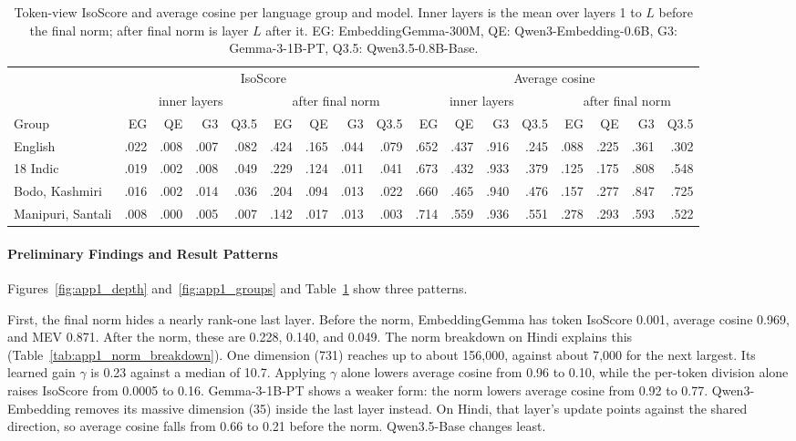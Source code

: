 \begin{table}[t]
\centering
\small
\setlength{\tabcolsep}{3.6pt}
\begin{tabular}{lrrrrrrrrrrrrrrrr}
\toprule
 & \multicolumn{8}{c}{IsoScore} & \multicolumn{8}{c}{Average cosine} \\
\cmidrule(lr){2-9}\cmidrule(lr){10-17}
 & \multicolumn{4}{c}{inner layers} & \multicolumn{4}{c}{after final norm} & \multicolumn{4}{c}{inner layers} & \multicolumn{4}{c}{after final norm} \\
\cmidrule(lr){2-5}\cmidrule(lr){6-9}\cmidrule(lr){10-13}\cmidrule(lr){14-17}
Group & EG & QE & G3 & Q3.5 & EG & QE & G3 & Q3.5 & EG & QE & G3 & Q3.5 & EG & QE & G3 & Q3.5 \\
\midrule
English & .022 & .008 & .007 & .082 & .424 & .165 & .044 & .079 & .652 & .437 & .916 & .245 & .088 & .225 & .361 & .302 \\
18 Indic & .019 & .002 & .008 & .049 & .229 & .124 & .011 & .041 & .673 & .432 & .933 & .379 & .125 & .175 & .808 & .548 \\
Bodo, Kashmiri & .016 & .002 & .014 & .036 & .204 & .094 & .013 & .022 & .660 & .465 & .940 & .476 & .157 & .277 & .847 & .725 \\
Manipuri, Santali & .008 & .000 & .005 & .007 & .142 & .017 & .013 & .003 & .714 & .559 & .936 & .551 & .278 & .293 & .593 & .522 \\
\bottomrule
\end{tabular}
\caption{Token-view IsoScore and average cosine per language group and model. Inner layers is the mean over layers 1 to $L$ before the final norm; after final norm is layer $L$ after it. EG: EmbeddingGemma-300M, QE: Qwen3-Embedding-0.6B, G3: Gemma-3-1B-PT, Q3.5: Qwen3.5-0.8B-Base.}
\label{tab:app1_groups}
\end{table}

\paragraph{Preliminary Findings and Result Patterns}
Figures~\ref{fig:app1_depth} and~\ref{fig:app1_groups} and Table~\ref{tab:app1_groups} show three patterns.

First, the final norm hides a nearly rank-one last layer. Before the norm, EmbeddingGemma has token IsoScore 0.001, average cosine 0.969, and MEV 0.871. After the norm, these are 0.228, 0.140, and 0.049. The norm breakdown on Hindi explains this (Table~\ref{tab:app1_norm_breakdown}). One dimension (731) reaches up to about 156{,}000, against about 7{,}000 for the next largest. Its learned gain $\gamma$ is 0.23 against a median of 10.7. Applying $\gamma$ alone lowers average cosine from 0.96 to 0.10, while the per-token division alone raises IsoScore from 0.0005 to 0.16. Gemma-3-1B-PT shows a weaker form: the norm lowers average cosine from 0.92 to 0.77. Qwen3-Embedding removes its massive dimension (35) inside the last layer instead. On Hindi, that layer's update points against the shared direction, so average cosine falls from 0.66 to 0.21 before the norm. Qwen3.5-Base changes least.

